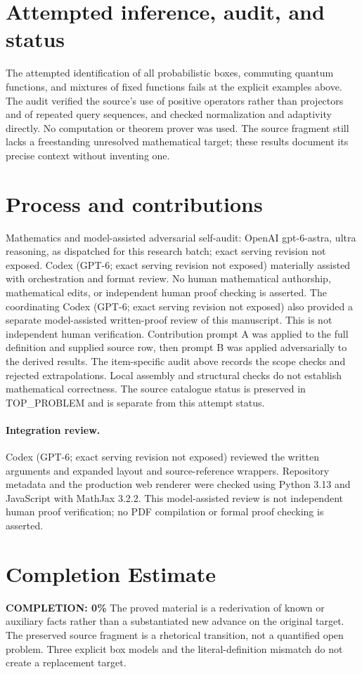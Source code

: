 \documentclass[11pt]{article}
\begin{document}
\section{Attempted inference, audit, and status}
The attempted identification of all probabilistic boxes, commuting
quantum functions, and mixtures of fixed functions fails at the
explicit examples above. The audit verified the source's use of
positive operators rather than projectors and of repeated query
sequences, and checked normalization and adaptivity directly.
No computation or theorem prover was used. The source fragment
still lacks a freestanding unresolved mathematical target; these
results document its precise context without inventing one.

\section{Process and contributions}
Mathematics and model-assisted adversarial self-audit: OpenAI gpt-6-astra, ultra reasoning, as dispatched for this research batch; exact serving revision not exposed. Codex (GPT-6; exact serving revision not exposed) materially assisted with orchestration and format review. No human mathematical authorship, mathematical edits, or independent human proof checking is asserted.
The coordinating Codex (GPT-6; exact serving revision not exposed) also provided a separate model-assisted written-proof review of this manuscript. This is not independent human verification.
Contribution prompt A was applied to the full definition and supplied source row, then prompt B was applied adversarially to the derived results. The item-specific audit above records the scope checks and rejected extrapolations. Local assembly and structural checks do not establish mathematical correctness. The source catalogue status is preserved in TOP\_PROBLEM and is separate from this attempt status.
\paragraph{Integration review.} Codex (GPT-6; exact serving revision not exposed) reviewed the written arguments and expanded layout and source-reference wrappers. Repository metadata and the production web renderer were checked using Python 3.13 and JavaScript with MathJax 3.2.2. This model-assisted review is not independent human proof verification; no PDF compilation or formal proof checking is asserted.

\section{Completion Estimate}
\noindent\textbf{COMPLETION: 0\%}
The proved material is a rederivation of known or auxiliary facts rather than a substantiated new advance on the original target. The preserved source fragment is a rhetorical transition, not a quantified open problem. Three explicit box models and the literal-definition mismatch do not create a replacement target.
\end{document}
